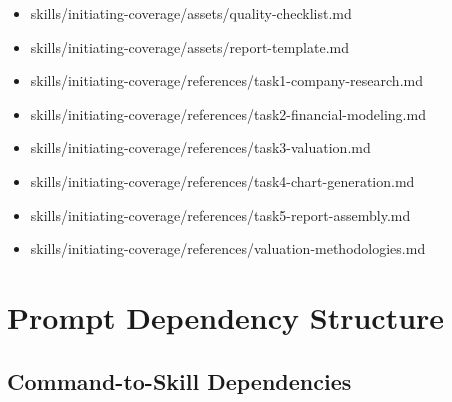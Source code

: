 \documentclass[11pt]{article}
\begin{document}
\begin{itemize}[leftmargin=*,itemsep=1pt,topsep=2pt]
\item \hspace*{2.7em}skills/initiating-coverage/assets/quality-checklist.md
\item \hspace*{2.7em}skills/initiating-coverage/assets/report-template.md
\item \hspace*{2.7em}skills/initiating-coverage/references/task1-company-research.md
\item \hspace*{2.7em}skills/initiating-coverage/references/task2-financial-modeling.md
\item \hspace*{2.7em}skills/initiating-coverage/references/task3-valuation.md
\item \hspace*{2.7em}skills/initiating-coverage/references/task4-chart-generation.md
\item \hspace*{2.7em}skills/initiating-coverage/references/task5-report-assembly.md
\item \hspace*{2.7em}skills/initiating-coverage/references/valuation-methodologies.md
\end{itemize}

\section{Prompt Dependency Structure}

\subsection{Command-to-Skill Dependencies}
\end{document}
